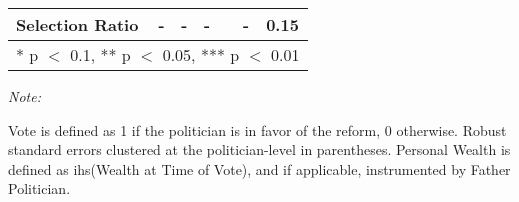\begin{table}[!h]
{\begin{threeparttable}
\begin{tabular}[t]{lcccccc}
Selection Ratio & - & - & - &  & - & 0.15\\
\bottomrule
\multicolumn{7}{l}{\rule{0pt}{1em}* p $<$ 0.1, ** p $<$ 0.05, *** p $<$ 0.01}\\
\end{tabular}
\begin{tablenotes}[para]
\item \textit{Note: } 
\item Vote is defined as 1 if the politician is in favor of the reform, 0 otherwise. Robust standard errors clustered at the politician-level in parentheses. Personal Wealth is defined as ihs(Wealth at Time of Vote), and if applicable, instrumented by Father Politician.
\end{tablenotes}
\end{threeparttable}}
\end{table}
